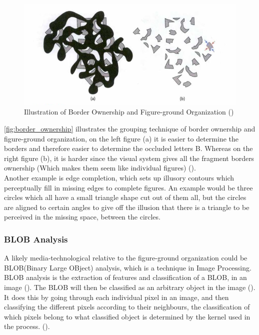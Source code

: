 \documentclass{article}
\newcommand{\goodcite}[1]{ {(\cite{#1})}}
\begin{document}
\begin{figure}[H]
    \centering
    \includegraphics[width=\textwidth]{img/b.png}
    \caption{Illustration of Border Ownership and Figure-ground Organization\goodcite{hsp}}
    \label{fig:border_ownership}
\end{figure}

\autoref{fig:border_ownership} illustrates the grouping technique of border ownership and figure-ground organization, on the left figure (a) it is easier to determine the borders and therefore easier to determine the occluded letters B. Whereas on the right figure (b), it is harder since the visual system gives all the fragment borders ownership (Which makes them seem like individual figures)\goodcite{hsp}.\medskip \\Another example is edge completion, which sets up illusory contours which perceptually fill in missing edges to complete figures. An example would be three circles which all have a small triangle shape cut out of them all, but the circles are aligned to certain angles to give off the illusion that there is a triangle to be perceived in the missing space, between the circles.\\
\subsubsection{BLOB Analysis}
A likely media-technological relative to the figure-ground organization could be BLOB(Binary Large OBject) analysis, which is a technique in Image Processing. BLOB analysis is the extraction of features and classification of a BLOB, in an image\goodcite{IP}. The BLOB will then be classified as an arbitrary object in the image\goodcite{IP}.\\It does this by going through each individual pixel in an image, and then classifying the different pixels according to their neighbours, the classification of which pixels belong to what classified object is determined by the kernel used in the process.\goodcite{IP}.\medskip \\
\end{document}
